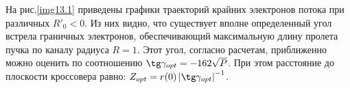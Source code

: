 На рис.\ref{img13.1} приведены графики траекторий крайних электронов потока 
при различных \( R'_0 < 0 \). Из них видно, что существует вполне определенный 
угол встрела граничных электронов, обеспечивающий максимальную длину пролета 
пучка по каналу радиуса \( R = 1 \). Этот угол, согласно расчетам, 
приближенно можно оценить по соотношению \( \tg\gamma_{opt} = -162\sqrt{P} \). 
При этом расстояние до плоскости кроссовера равно:
\( Z_{opt} = r(0)\left| \tg\gamma_{opt} \right|^{-1} \).